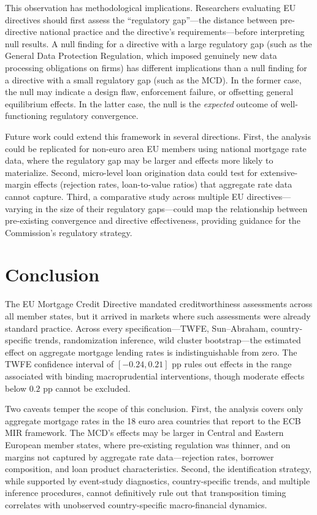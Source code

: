 \documentclass[12pt]{article}
\begin{document}
This observation has methodological implications. Researchers evaluating EU directives should first assess the ``regulatory gap''---the distance between pre-directive national practice and the directive's requirements---before interpreting null results. A null finding for a directive with a large regulatory gap (such as the General Data Protection Regulation, which imposed genuinely new data processing obligations on firms) has different implications than a null finding for a directive with a small regulatory gap (such as the MCD). In the former case, the null may indicate a design flaw, enforcement failure, or offsetting general equilibrium effects. In the latter case, the null is the \textit{expected} outcome of well-functioning regulatory convergence.

Future work could extend this framework in several directions. First, the analysis could be replicated for non-euro area EU members using national mortgage rate data, where the regulatory gap may be larger and effects more likely to materialize. Second, micro-level loan origination data could test for extensive-margin effects (rejection rates, loan-to-value ratios) that aggregate rate data cannot capture. Third, a comparative study across multiple EU directives---varying in the size of their regulatory gaps---could map the relationship between pre-existing convergence and directive effectiveness, providing guidance for the Commission's regulatory strategy.


\section{Conclusion}
\label{sec:conclusion}

The EU Mortgage Credit Directive mandated creditworthiness assessments across all member states, but it arrived in markets where such assessments were already standard practice. Across every specification---TWFE, Sun--Abraham, country-specific trends, randomization inference, wild cluster bootstrap---the estimated effect on aggregate mortgage lending rates is indistinguishable from zero. The TWFE confidence interval of $[-0.24, 0.21]$ pp rules out effects in the range associated with binding macroprudential interventions, though moderate effects below $0.2$ pp cannot be excluded.

Two caveats temper the scope of this conclusion. First, the analysis covers only aggregate mortgage rates in the 18 euro area countries that report to the ECB MIR framework. The MCD's effects may be larger in Central and Eastern European member states, where pre-existing regulation was thinner, and on margins not captured by aggregate rate data---rejection rates, borrower composition, and loan product characteristics. Second, the identification strategy, while supported by event-study diagnostics, country-specific trends, and multiple inference procedures, cannot definitively rule out that transposition timing correlates with unobserved country-specific macro-financial dynamics.
\end{document}
